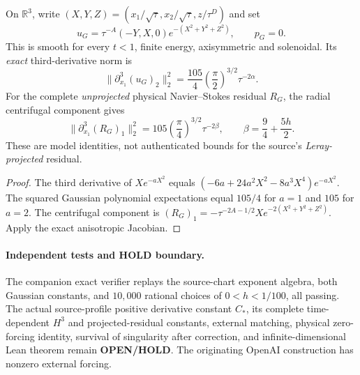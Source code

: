 \begin{proposition}
On $\mathbb R^3$, write $(X,Y,Z)=(x_1/\sqrt{\tau},x_2/\sqrt{\tau},z/\tau^D)$ and set
\[
u_G=\tau^{-A}(-Y,X,0)e^{-(X^2+Y^2+Z^2)},\qquad p_G=0.
\]
This is smooth for every $t<1$, finite energy, axisymmetric and solenoidal. Its \emph{exact} third-derivative norm is
\[
\|\partial_{x_1}^3(u_G)_2\|_2^2
=\frac{105}{4}\left(\frac\pi2\right)^{3/2}\tau^{-2\alpha}.
\]
For the complete \emph{unprojected} physical Navier--Stokes residual $R_G$, the radial centrifugal component gives
\[
\|\partial_{x_1}^3(R_G)_1\|_2^2
=105\left(\frac\pi4\right)^{3/2}\tau^{-2\beta},
\qquad \beta=\frac94+\frac{5h}{2}.
\]
These are model identities, not authenticated bounds for the source's \emph{Leray-projected} residual.
\end{proposition}
\begin{proof}
The third derivative of $Xe^{-aX^2}$ equals
$(-6a+24a^2X^2-8a^3X^4)e^{-aX^2}$.
The squared Gaussian polynomial expectations equal $105/4$ for $a=1$ and $105$ for $a=2$. The centrifugal component is
$(R_G)_1=-\tau^{-2A-1/2}X e^{-2(X^2+Y^2+Z^2)}$.
Apply the exact anisotropic Jacobian.
\end{proof}
\paragraph{Independent tests and HOLD boundary.}
The companion exact verifier replays the source-chart exponent algebra, both Gaussian constants, and $10{,}000$ rational choices of $0<h<1/100$, all passing. The actual source-profile positive derivative constant $C_*$, its complete time-dependent $H^3$ and projected-residual constants, external matching, physical zero-forcing identity, survival of singularity after correction, and infinite-dimensional Lean theorem remain \textbf{OPEN/HOLD}. The originating OpenAI construction has nonzero external forcing.